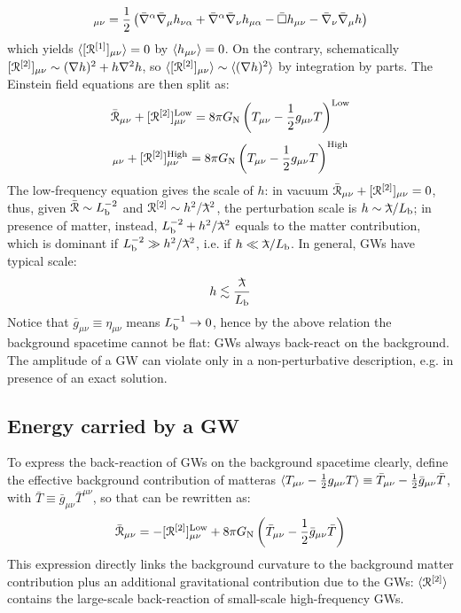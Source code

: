 \begin{equation}
  [\rr\od1]_{\mu \nu} = \frac{1}{2} \left( \bar{\na}^\alpha \bar{\na}_\mu h_{\nu \alpha} + \bar{\na}^\alpha \bar{\na}_\nu h_{\mu \alpha} - \bar{\dal} h_{\mu \nu} - \bar{\na}_\nu \bar{\na}_\mu h \right)
\end{equation}
which yields $ \braket{[\EuScript{R}^{[1]}]_{\mu \nu}} = 0 $ by $ \braket{h_{\mu \nu}} = 0 $. On the contrary, schematically $ [\EuScript{R}^{[2]}]_{\mu \nu} \sim (\nabla h)^2 + h \nabla^2 h $, so $ \braket{[\EuScript{R}^{[2]}]_{\mu \nu}} \sim \braket{(\nabla h)^2} $ by integration by parts. The Einstein field equations are then split as:
\begin{equation}
  \bar{\EuScript{R}}_{\mu \nu} + [\EuScript{R}^{[2]}]_{\mu \nu}^\text{Low} = 8\pi G_\text{N} \left( T_{\mu \nu} - \frac{1}{2} g_{\mu \nu} T \right)^\text{Low}
  \label{eq:gw-low}
\end{equation}
\begin{equation}
  [\rr\od1]_{\mu \nu} + [\rr\od2]_{\mu \nu}^\text{High} = 8\pi \gn \left( T_{\mu \nu} - \frac{1}{2} g_{\mu \nu} T \right)^\text{High}
  \label{eq:gw-high}
\end{equation}
The low-frequency equation gives the scale of $ h $: in vacuum $ \bar{\EuScript{R}}_{\mu \nu} + [\EuScript{R}^{[2]}]_{\mu \nu} = 0 $, thus, given $ \bar{\EuScript{R}} \sim L_\text{b}^{-2} $ and $ \rr\od2 \sim h^2 / \lbar^2 $, the perturbation scale is $ h \sim \lbar / L_\text{b} $; in presence of matter, instead, $ L_\text{b}^{-2} + h^2 / \lbar^2 $ equals to the matter contribution, which is dominant if $ L_\text{b}^{-2} \gg h^2 / \lbar^2 $, i.e. if $ h \ll \lbar / L_\text{b} $. In general, GWs have typical scale:
\begin{equation}
  h \lesssim \frac{\lbar}{L_\text{b}}
  \label{eq:gw-ampl-constraint}
\end{equation}
Notice that $ \bar{g}_{\mu \nu} \equiv \eta_{\mu \nu} $ means $ L_\text{b}^{-1} \rightarrow 0 $, hence by the above relation the background spacetime cannot be flat: GWs always back-react on the background. The amplitude of a GW can violate  only in a non-perturbative description, e.g. in presence of an exact solution.

\subsection{Energy carried by a GW}

To express the back-reaction of GWs on the background spacetime clearly, define the effective background contribution of matter\footnotemark as $ \braket{T_{\mu \nu} - \frac{1}{2} g_{\mu \nu} T} \equiv \bar{T}_{\mu \nu} - \frac{1}{2} \bar{g}_{\mu \nu} \bar{T} $, with $ \bar{T} \equiv \bar{g}_{\mu \nu} \bar{T}^{\mu \nu} $, so that  can be rewritten as:
\begin{equation}
  \bar{\EuScript{R}}_{\mu \nu} = - [\EuScript{R}^{[2]}]_{\mu \nu}^\text{Low} + 8 \pi G_\text{N} \left( \bar{T}_{\mu \nu} - \frac{1}{2} \bar{g}_{\mu \nu} \bar{T} \right)
  \label{eq:gw-background}
\end{equation}
This expression directly links the background curvature to the background matter contribution plus an additional gravitational contribution due to the GWs: $ \braket{\EuScript{R}^{[2]}} $ contains the large-scale back-reaction of small-scale high-frequency GWs.

